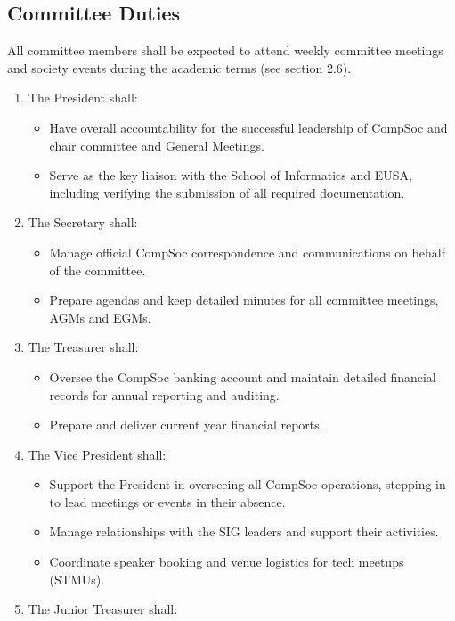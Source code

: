\subsection{Committee Duties}
All committee members shall be expected to attend weekly committee meetings and society events during the academic terms (see section 2.6).
\begin{enumerate}
    \item The President shall:
    \begin{itemize}
        \item Have overall accountability for the successful leadership of CompSoc and chair committee and General Meetings.  
        \item Serve as the key liaison with the School of Informatics and EUSA, including verifying the submission of all required documentation.
    \end{itemize}
    \item The Secretary shall:
    \begin{itemize}
        \item Manage official CompSoc correspondence and communications on behalf of the committee.
        \item Prepare agendas and keep detailed minutes for all committee meetings, AGMs and EGMs.  
    \end{itemize}
    \item The Treasurer shall:
    \begin{itemize}
        \item Oversee the CompSoc banking account and maintain detailed financial records for annual reporting and auditing.
        \item Prepare and deliver current year financial reports.
    \end{itemize}
    \item The Vice President shall:
    \begin{itemize}
        \item Support the President in overseeing all CompSoc operations, stepping in to lead meetings or events in their absence.  
        \item Manage relationships with the SIG leaders and support their activities.
        \item Coordinate speaker booking and venue logistics for tech meetups (STMUs).
    \end{itemize}
    \item The Junior Treasurer shall:
    \begin{itemize}

\end{itemize}
\end{enumerate}
